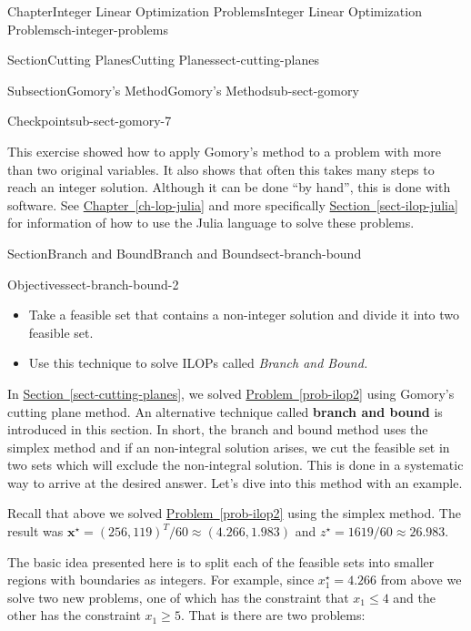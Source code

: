 \documentclass[oneside,10pt,]{book}
\newcommand{\xreffont}{\relax}
\newcommand{\terminology}[1]{\textbf{#1}}
\numberwithin{equation}{section}
\begin{document}
\begin{chapterptx}{Chapter}{Integer Linear Optimization Problems}{}{Integer Linear Optimization Problems}{}{}{ch-integer-problems}
\begin{sectionptx}{Section}{Cutting Planes}{}{Cutting Planes}{}{}{sect-cutting-planes}
\begin{subsectionptx}{Subsection}{Gomory's Method}{}{Gomory's Method}{}{}{sub-sect-gomory}
\begin{inlineexercise}{Checkpoint}{}{sub-sect-gomory-7}
\end{inlineexercise}%
This exercise showed how to apply Gomory's method to a problem with more than two original variables. It also shows that often this takes many steps to reach an integer solution.  Although it can be done ``by hand'', this is done with software.  See \hyperref[ch-lop-julia]{Chapter~{\xreffont\ref{ch-lop-julia}}} and more specifically \hyperref[sect-ilop-julia]{Section~{\xreffont\ref{sect-ilop-julia}}} for information of how to use the Julia language to solve these problems.%
\end{subsectionptx}
\end{sectionptx}
%
%
\typeout{************************************************}
\typeout{************************************************}
%
\begin{sectionptx}{Section}{Branch and Bound}{}{Branch and Bound}{}{}{sect-branch-bound}
\begin{objectives}{Objectives}{sect-branch-bound-2}
%
\begin{itemize}[label=\textbullet]
\item{}Take a feasible set that contains a non-integer solution and divide it into two feasible set.%
\item{}Use this technique to solve ILOPs called \emph{Branch and Bound.}%
\end{itemize}
\end{objectives}
\begin{introduction}{}%
In \hyperref[sect-cutting-planes]{Section~{\xreffont\ref{sect-cutting-planes}}}, we solved \hyperref[prob-ilop2]{Problem~{\xreffont\ref{prob-ilop2}}} using Gomory's cutting plane method. An alternative technique called \terminology{branch and bound} is introduced in this section. In short, the branch and bound method uses the simplex method and if an non-integral solution arises, we cut the feasible set in two sets which will exclude the non-integral solution. This is done in a systematic way to arrive at the desired answer. Let's dive into this method with an example.%
\par
Recall that above we solved \hyperref[prob-ilop2]{Problem~{\xreffont\ref{prob-ilop2}}} using the simplex method. The result was \(\boldsymbol{x}^{\star}=(256,119)^{T}/60\approx (4.266,1.983)\) and \(z^{\star}=1619/60\approx 26.983\).%
\par
The basic idea presented here is to split each of the feasible sets into smaller regions with boundaries as integers. For example, since \(x_{1}^{\star}=4.266\) from above we solve two new problems, one of which has the constraint that \(x_{1} \leq 4\) and the other has the constraint \(x_{1} \geq 5\). That is there are two problems:%

\end{introduction}
\end{sectionptx}
\end{chapterptx}
\end{document}
